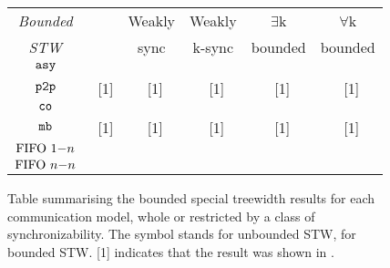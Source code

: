 \newcommand{\cmark}{\ding{51}}%
\newcommand{\xmark}{\ding{55}}%
\begin{figure}[ht]
		\begin{tabular}{|c || c | c | c|  c| c| }
			\hline
			\emph{Bounded} &  & Weakly  & Weakly  & $\exists$k & $\forall$k  \\
			\emph{STW} & & sync & k-sync & bounded & bounded \\
			\hline \hline
			$\mathtt{asy}$ & \ding{55} & \xmark & \cmark & \cmark & \cmark \\
			\hline
			$\mathtt{p2p}$ & \xmark~[1] & \xmark~[1] & \cmark~[1] & \cmark~[1] & \cmark~[1] \\
			\hline
			$\mathtt{co}$ & \xmark & \xmark & \cmark & \cmark & \cmark \\
			\hline
			$\mathtt{mb}$&  \xmark~[1]& \cmark~[1] & \cmark~[1] & \cmark~[1] & \cmark~[1] \\
			\hline
			$\text{FIFO } 1\mathsf{-}n$ & \xmark & \cmark & \cmark & \cmark & \cmark \\
			\hline
			$\text{FIFO } n\mathsf{-}n$ & \xmark & \cmark & \cmark & \cmark & \cmark \\
			\hline
		\end{tabular}
		\caption{Table summarising the bounded special treewidth results for each communication model, whole or restricted by a class of synchronizability. The symbol \xmark\;stands for unbounded STW, \cmark\;for bounded STW.  [1] indicates that the result was shown in  \cite{BolligFG21}.}
		\label{fig:stw-bound}
\end{figure}
